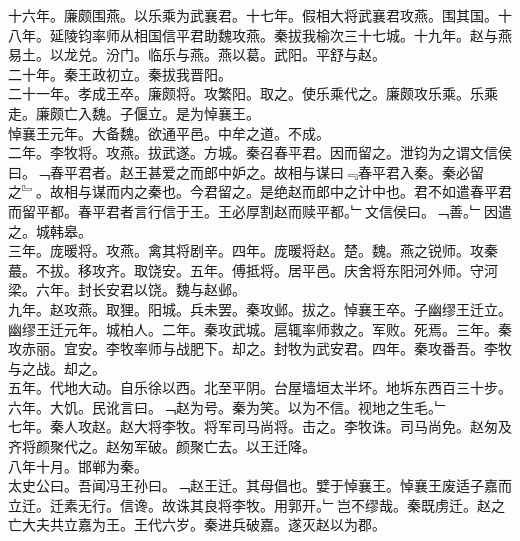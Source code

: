 \documentclass{zhvt-classic}
\begin{document}
\hspace*{2em}十六年。廉颇围燕。以乐乘为武襄君。十七年。假相大将武襄君攻燕。围其国。十八年。延陵钧率师从相国信平君助魏攻燕。秦拔我榆次三十七城。十九年。赵与燕易土。以龙兑。汾门。临乐与燕。燕以葛。武阳。平舒与赵。\\
\hspace*{2em}二十年。秦王政初立。秦拔我晋阳。\\
\hspace*{2em}二十一年。孝成王卒。廉颇将。攻繁阳。取之。使乐乘代之。廉颇攻乐乘。乐乘走。廉颇亡入魏。子偃立。是为悼襄王。\\
\hspace*{2em}悼襄王元年。大备魏。欲通平邑。中牟之道。不成。\\
\hspace*{2em}二年。李牧将。攻燕。拔武遂。方城。秦召春平君。因而留之。泄钧为之谓文信侯曰。﹁春平君者。赵王甚爱之而郎中妒之。故相与谋曰﹃春平君入秦。秦必留之﹄。故相与谋而内之秦也。今君留之。是绝赵而郎中之计中也。君不如遣春平君而留平都。春平君者言行信于王。王必厚割赵而赎平都。﹂文信侯曰。﹁善。﹂因遣之。城韩皋。\\
\hspace*{2em}三年。庞暖将。攻燕。禽其将剧辛。四年。庞暖将赵。楚。魏。燕之锐师。攻秦蕞。不拔。移攻齐。取饶安。五年。傅抵将。居平邑。庆舍将东阳河外师。守河梁。六年。封长安君以饶。魏与赵邺。\\
\hspace*{2em}九年。赵攻燕。取狸。阳城。兵未罢。秦攻邺。拔之。悼襄王卒。子幽缪王迁立。\\
\hspace*{2em}幽缪王迁元年。城柏人。二年。秦攻武城。扈辄率师救之。军败。死焉。三年。秦攻赤丽。宜安。李牧率师与战肥下。却之。封牧为武安君。四年。秦攻番吾。李牧与之战。却之。\\
\hspace*{2em}五年。代地大动。自乐徐以西。北至平阴。台屋墙垣太半坏。地坼东西百三十步。六年。大饥。民讹言曰。﹁赵为号。秦为笑。以为不信。视地之生毛。﹂\\
\hspace*{2em}七年。秦人攻赵。赵大将李牧。将军司马尚将。击之。李牧诛。司马尚免。赵匆及齐将颜聚代之。赵匆军破。颜聚亡去。以王迁降。\\
\hspace*{2em}八年十月。邯郸为秦。\\
\hspace*{2em}太史公曰。吾闻冯王孙曰。﹁赵王迁。其母倡也。嬖于悼襄王。悼襄王废适子嘉而立迁。迁素无行。信谗。故诛其良将李牧。用郭开。﹂岂不缪哉。秦既虏迁。赵之亡大夫共立嘉为王。王代六岁。秦进兵破嘉。遂灭赵以为郡。\\
\end{document}
